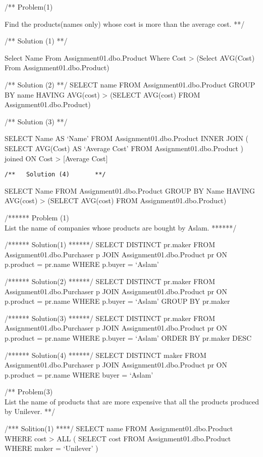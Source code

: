 /** Problem(1)

Find the products(names only) whose cost is more than the average cost.
**/

/** Solution (1) **/

Select Name From Assignment01.dbo.Product Where Cost \textgreater{}
(Select AVG(Cost) From Assignment01.dbo.Product)

/** Solution (2) **/ SELECT name FROM Assignment01.dbo.Product GROUP BY
name HAVING AVG(cost) \textgreater{} (SELECT AVG(cost) FROM
Assignment01.dbo.Product)

/** Solution (3) **/

SELECT Name AS `Name' FROM Assignment01.dbo.Product INNER JOIN ( SELECT
AVG(Cost) AS `Average Cost' FROM Assignment01.dbo.Product ) joined ON
Cost \textgreater{} {[}Average Cost{]}

\begin{verbatim}
/**   Solution (4)       **/
\end{verbatim}

SELECT Name FROM Assignment01.dbo.Product GROUP BY Name HAVING AVG(cost)
\textgreater{} (SELECT AVG(cost) FROM Assignment01.dbo.Product)

/****** Problem (1)\\
List the name of companies whose products are bought by Aslam. ******/

/****** Solution(1) ******/ SELECT DISTINCT pr.maker FROM
Assignment01.dbo.Purchaser p JOIN Assignment01.dbo.Product pr ON
p.product = pr.name WHERE p.buyer = `Aslam'

/****** Solution(2) ******/ SELECT DISTINCT pr.maker FROM
Assignment01.dbo.Purchaser p JOIN Assignment01.dbo.Product pr ON
p.product = pr.name WHERE p.buyer = `Aslam' GROUP BY pr.maker

/****** Solution(3) ******/ SELECT DISTINCT pr.maker FROM
Assignment01.dbo.Purchaser p JOIN Assignment01.dbo.Product pr ON
p.product = pr.name WHERE p.buyer = `Aslam' ORDER BY pr.maker DESC

/****** Solution(4) ******/ SELECT DISTINCT maker FROM
Assignment01.dbo.Purchaser p JOIN Assignment01.dbo.Product pr ON
p.product = pr.name WHERE buyer = `Aslam'

/** Problem(3)\\
List the name of products that are more expensive that all the products
produced by Unilever. **/

/*** Solition(1) ****/ SELECT name FROM Assignment01.dbo.Product WHERE
cost \textgreater{} ALL ( SELECT cost FROM Assignment01.dbo.Product
WHERE maker = `Unilever' )

